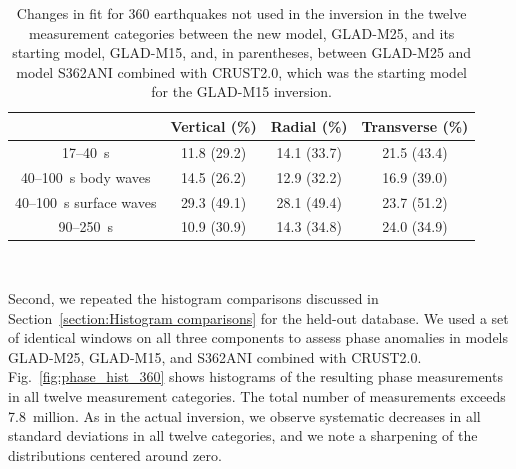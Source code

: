 \documentclass[extra,mreferee]{gji}
\begin{document}
\begin{table}[!htb]
  \centering
  \begin{tabular}{|c|c|c|c|}
  \hline
  ~          &  Vertical (\%) & Radial (\%) &  Transverse (\%) \\
  \hline
  17--40~s                &          11.8 (29.2) &       14.1 (33.7) &       21.5 (43.4) \\
  40--100~s body waves    &          14.5 (26.2) &       12.9 (32.2)  &       16.9 (39.0) \\
  40--100~s surface waves &          29.3 (49.1) &       28.1 (49.4) &       23.7 (51.2) \\
  90--250~s               &          10.9 (30.9) &       14.3 (34.8)  &       24.0 (34.9) \\
  \hline
  \end{tabular}\\
  \caption{Changes in fit for 360 earthquakes not used in the inversion in the twelve measurement categories
between the new model, GLAD-M25, and its starting model, GLAD-M15, and, in parentheses, between GLAD-M25 and model S362ANI combined with CRUST2.0, which was the starting model for the GLAD-M15 inversion.}
  \label{table:misfit_reduction_M15_M25_360}
\end{table}


Second, we repeated the histogram comparisons discussed in Section~\ref{section:Histogram comparisons} for the held-out database.
We used a set of identical windows on all three components to assess
phase anomalies in models GLAD-M25, GLAD-M15, and S362ANI combined with CRUST2.0.
Fig.~\ref{fig:phase_hist_360} shows histograms of the resulting phase
measurements in all twelve measurement categories.
The total number of measurements exceeds 7.8~million.
As in the actual inversion,
we observe systematic decreases in all standard deviations in all twelve categories,
and we note a sharpening of the distributions centered around zero.
\end{document}
